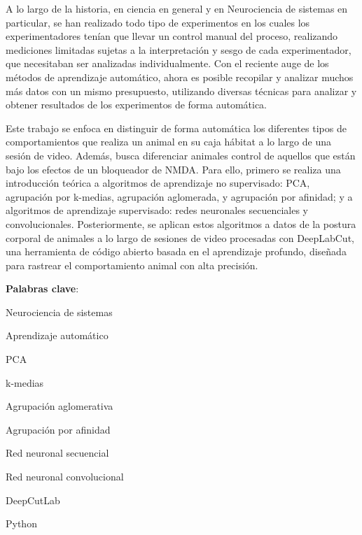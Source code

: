 A lo largo de la historia, en ciencia en general y en Neurociencia de sistemas en particular, se han realizado todo tipo de experimentos en los cuales los experimentadores tenían que llevar un control manual del proceso, realizando mediciones limitadas sujetas a la interpretación y sesgo de cada experimentador, que necesitaban ser analizadas individualmente. Con el reciente auge de los métodos de aprendizaje automático, ahora es posible recopilar y analizar muchos más datos con un mismo presupuesto, utilizando diversas técnicas para analizar y obtener resultados de los experimentos de forma automática.

Este trabajo se enfoca en distinguir de forma automática los diferentes tipos de comportamientos que realiza un animal en su caja hábitat a lo largo de una sesión de video. Además, busca diferenciar animales control de aquellos que están bajo los efectos de un bloqueador de NMDA. Para ello, primero se realiza una introducción teórica a algoritmos de aprendizaje no supervisado: PCA, agrupación por k-medias, agrupación aglomerada, y agrupación por afinidad; y a algoritmos de aprendizaje supervisado: redes neuronales secuenciales y convolucionales. Posteriormente, se aplican estos algoritmos a datos de la postura corporal de animales a lo largo de sesiones de video procesadas con DeepLabCut, una herramienta de código abierto basada en el aprendizaje profundo, diseñada para rastrear el comportamiento animal con alta precisión.


\mbox{} \bigskip

\noindent \textbf{Palabras clave}:
\begin{compactitem}
    \item Neurociencia de sistemas
    \item Aprendizaje automático
    \item PCA
    \item k-medias
    \item Agrupación aglomerativa
    \item Agrupación por afinidad
    \item Red neuronal secuencial
    \item Red neuronal convolucional
    \item DeepCutLab
    \item Python
\end{compactitem}